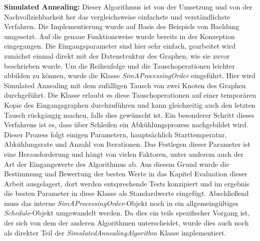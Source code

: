 \textbf{Simulated Annealing:} Dieser Algorithmus ist von der Umsetzung und von der Nachvollziehbarkeit her das vergleichsweise einfachste und verständlichste Verfahren. Die Implementierung wurde auf Basis des Beispiels von Baeldung \cite{simABaeldung} umgesetzt. Auf die genaue Funktionsweise wurde bereits in der Konzeption eingegangen. Die Eingangsparameter sind hier sehr einfach, gearbeitet wird zunächst einmal direkt mit der Datenstruktur des Graphen, wie sie zuvor beschrieben wurde. Um die Reihenfolge und die Tauschoperationen leichter abbilden zu können, wurde die Klasse \textit{SimAProcessingOrder} eingeführt. Hier wird Simulated Annealing mit dem zufälligen Tausch von zwei Knoten des Graphen durchgeführt. Die Klasse erlaubt es diese Tauschoperationen auf einer temporären Kopie des Eingangsgraphen durchzuführen und kann gleichzeitig auch den letzten Tausch rückgängig machen, falls dies gewünscht ist. Ein besonderer Schritt dieses Verfahrens ist es, dass über Schleifen ein Abkühlungsprozess nachgebildet wird. Dieser Prozess folgt einigen Parametern, hauptsächlich Starttemperatur, Abkühlungsrate und Anzahl von Iterationen. Das Festlegen dieser Parameter ist eine Herausforderung und hängt von vielen Faktoren, unter anderem auch der Art der Eingangswerte des Algorithmus ab. Aus diesem Grund wurde die Bestimmung und Bewertung der besten Werte in das Kapitel Evaluation dieser Arbeit ausgelagert, dort werden entsprechende Tests konzipiert und im ergebnis die besten Parameter in diese Klasse als Standardwerte eingefügt. Abschließend muss das interne \textit{SimAProcessingOrder}-Objekt noch in ein allgemeingültiges \textit{Schedule}-Objekt umgewandelt werden. Da dies ein teils spezifischer Vorgang ist, der sich von dem der anderen Algorithmen unterscheidet, wurde dies auch noch als direkter Teil der \textit{SimulatedAnnealingAlgorithm} Klasse implementiert.%

